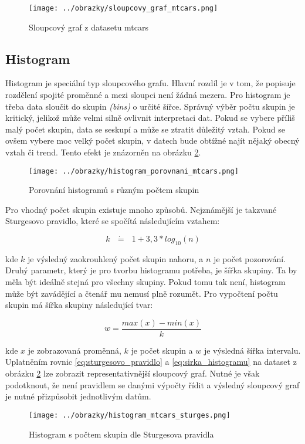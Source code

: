 \begin{figure}[H]
    \centering
    \texttt{[image: ../obrazky/sloupcovy\_graf\_mtcars.png]}
    \caption{Sloupcový graf z datasetu mtcars} 
    \label{fig:sloupcovy_graf_mtcars}
\end{figure}

\subsection{Histogram}

Histogram je speciální typ sloupcového grafu. Hlavní rozdíl je v tom, že popisuje rozdělení spojité proměnné a mezi sloupci není žádná mezera.
Pro histogram je třeba data sloučit do skupin \textit{(bins)} o určité šířce. Správný výběr počtu skupin je kritický, jelikož může velmi
silně ovlivnit interpretaci dat. Pokud se vybere příliš malý počet skupin, data se seskupí a může se ztratit důležitý vztah. Pokud se ovšem
vybere moc velký počet skupin, v datech bude obtížné najít nějaký obecný vztah či trend.
Tento efekt je znázorněn na obrázku \ref{fig:histogram_porovnani_mtcars}.

\begin{figure}[H]
    \centering
    \texttt{[image: ../obrazky/histogram\_porovnani\_mtcars.png]}
    \caption{Porovnání histogramů s různým počtem skupin} 
    \label{fig:histogram_porovnani_mtcars}
\end{figure}

Pro vhodný počet skupin existuje mnoho způsobů. Nejznámější je takzvané Sturgesovo pravidlo, které se spočítá následujícím vztahem:

\begin{equation}
    \label{eq:sturgesovo_pravidlo}
    k \text{ } \dot{\mathbf{=}} \text{ } 1 + 3,3 * log_{10}(n)
\end{equation}

kde $k$ je výsledný zaokrouhlený počet skupin nahoru, 
a $n$ je počet pozorování. Druhý parametr, který je pro tvorbu histogramu potřeba, je šířka skupiny.
Ta by měla být ideálně stejná pro všechny skupiny. Pokud tomu tak není, histogram může být zavádějící a čtenář mu nemusí plně rozumět.
Pro vypočtení počtu skupin má šířka skupiny následující tvar:

\begin{equation}
    \label{eq:sirka_histogramu}
    w = \frac{max(x) - min(x)}{k}
\end{equation}

kde $x$ je zobrazovaná proměnná, $k$ je počet skupin a $w$ je výsledná šířka intervalu. 
{\color{red}
Uplatněním rovnic \ref{eq:sturgesovo_pravidlo} a \ref{eq:sirka_histogramu} na dataset z obrázku \ref{fig:histogram_porovnani_mtcars}
lze zobrazit representativnější sloupcový graf. Nutné je však podotknout, že není pravidlem se danými výpočty řídit a výsledný
sloupcový graf je nutné přizpůsobit jednotlivým datům.
}
\begin{figure}[H]
    \centering
    \texttt{[image: ../obrazky/histogram\_mtcars\_sturges.png]}
    \caption{Histogram s počtem skupin dle Sturgesova pravidla} 
    \label{fig:histogram_mtcars_sturges}
\end{figure}

